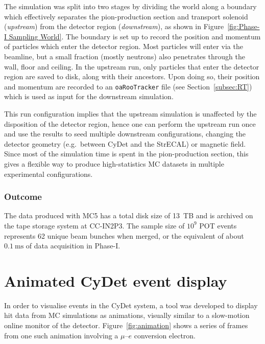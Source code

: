 The simulation was split into two stages by dividing the world along a boundary
which effectively separates the pion-production section and transport solenoid
(\emph{upstream}) from the detector region (\emph{downstream}), as shown in
Figure~\ref{fig:Phase-I Sampling World}. The boundary is set up to record the
position and momentum of particles which enter the detector region. Most
particles will enter via the beamline, but a small fraction (mostly neutrons)
also penetrates through the wall, floor and ceiling. In the upstream run, only
particles that enter the detector region are saved to disk, along with their
ancestors. Upon doing so, their position and momentum are recorded to an
\texttt{oaRooTracker} file (see Section~\ref{subsec:RT}) which is used as input
for the downstream simulation.

This run configuration implies that the upstream simulation is unaffected by the
disposition of the detector region, hence one can perform the upstream run once
and use the results to seed multiple downstream configurations, changing the
detector geometry (e.g.\ between CyDet and the StrECAL) or magnetic field. Since
most of the simulation time is spent in the pion-production section, this gives
a flexible way to produce high-statistics MC datasets in multiple experimental
configurations.

\subsubsection{Outcome}
The data produced with MC5 has a total disk size of \SI{13}{TB} and is archived
on the tape storage system at CC-IN2P3. The sample size of $10^9$ POT events
represents 62 unique beam bunches when merged, or the equivalent of
about $\SI{0.1}{\ms}$ of data acquisition in Phase-I.

\section{Animated CyDet event display}
In order to visualise events in the CyDet system, a tool was developed to display
hit data from MC simulations as animations, visually similar to a slow-motion
online monitor of the detector. Figure~\ref{fig:animation} shows a series of
frames from one such animation involving a $\mu$--$e$ conversion electron.

